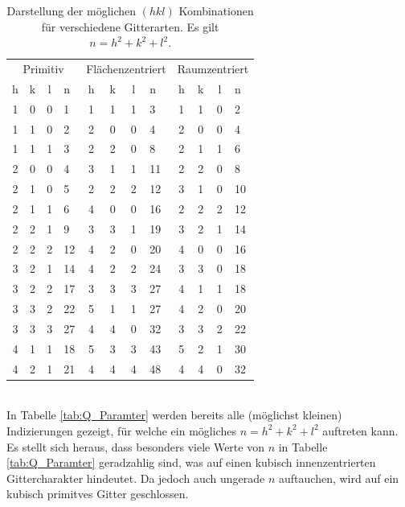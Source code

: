 \documentclass[a4paper,twoside,final]{article}
\begin{document}
\begin{table}[ht]
	\centering
	\caption{Darstellung der möglichen $(hkl)$ Kombinationen für verschiedene Gitterarten. Es gilt $n = h^2+k^2+l^2$.}
	\label{tab:Indizierung}
	\begin{tabular}{c c c l c c c l c c c l}
		\toprule
      \multicolumn{4}{c}{Primitiv} & \multicolumn{4}{c}{Flächenzentriert} & \multicolumn{4}{c}{Raumzentriert}\\
      \cmidrule(lr){1-4}\cmidrule(lr){5-8}\cmidrule(lr){9-12}
      h & k & l & n & h & k & l & n & h & k & l & n \\
      \midrule
      1 & 0 & 0 & 1   & 1 & 1 & 1 & 3   & 1 & 1 & 0 & 2   \\
      1 & 1 & 0 & 2   & 2 & 0 & 0 & 4   & 2 & 0 & 0 & 4   \\
      1 & 1 & 1 & 3   & 2 & 2 & 0 & 8   & 2 & 1 & 1 & 6   \\
      2 & 0 & 0 & 4   & 3 & 1 & 1 & 11  & 2 & 2 & 0 & 8   \\
      2 & 1 & 0 & 5   & 2 & 2 & 2 & 12  & 3 & 1 & 0 & 10  \\
      2 & 1 & 1 & 6   & 4 & 0 & 0 & 16  & 2 & 2 & 2 & 12  \\
      2 & 2 & 1 & 9   & 3 & 3 & 1 & 19  & 3 & 2 & 1 & 14  \\
      2 & 2 & 2 & 12  & 4 & 2 & 0 & 20  & 4 & 0 & 0 & 16  \\
      3 & 2 & 1 & 14  & 4 & 2 & 2 & 24  & 3 & 3 & 0 & 18  \\
      3 & 2 & 2 & 17  & 3 & 3 & 3 & 27  & 4 & 1 & 1 & 18  \\
      3 & 3 & 2 & 22  & 5 & 1 & 1 & 27  & 4 & 2 & 0 & 20  \\
      3 & 3 & 3 & 27  & 4 & 4 & 0 & 32  & 3 & 3 & 2 & 22  \\
      4 & 1 & 1 & 18  & 5 & 3 & 3 & 43  & 5 & 2 & 1 & 30  \\
      4 & 2 & 1 & 21  & 4 & 4 & 4 & 48  & 4 & 4 & 0 & 32
	\end{tabular}
\end{table}\\
In Tabelle \ref{tab:Q_Paramter} werden bereits alle (möglichst kleinen) Indizierungen gezeigt, für welche ein mögliches $n = h^2+ k^2 +l^2$ auftreten kann. Es stellt sich heraus, dass besonders viele Werte von $n$ in Tabelle \ref{tab:Q_Paramter} geradzahlig sind, was auf einen kubisch innenzentrierten Gittercharakter hindeutet. Da jedoch auch ungerade $n$ auftauchen, wird auf ein kubisch primitves Gitter geschlossen.
\end{document}
